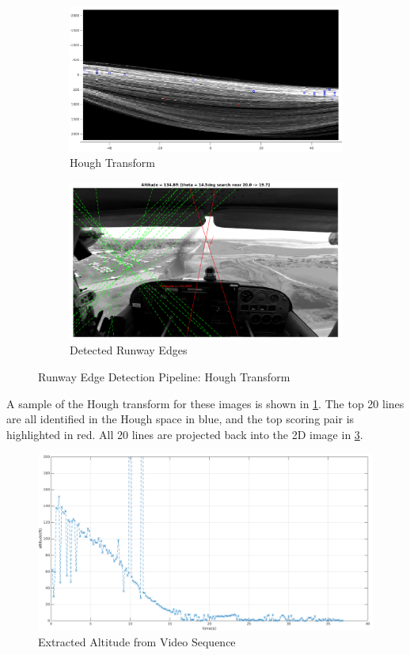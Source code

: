 \documentclass[letterpaper, conference]{IEEEtran}  %
\begin{document}
\begin{figure}
\centering
\begin{subfigure}{\textwidth}
	\includegraphics[width= \textwidth]{Hough.png} 
	\caption{\label{fig:Hough}  Hough Transform}
\end{subfigure}
\begin{subfigure}{\textwidth}
    \centering
	\includegraphics[width= \textwidth]{result.png} 
	\caption{\label{fig:final}  Detected Runway Edges}
\end{subfigure}
\caption{Runway Edge Detection Pipeline: Hough Transform}
\end{figure}

A sample of the Hough transform for these images is shown in \cref{fig:Hough}. The top 20 lines are all identified in the Hough space in blue, and the top scoring pair is highlighted in red. All 20 lines are projected back into the 2D image in \cref{fig:final}.
\newpage

\begin{figure}[ht]
\centering
	\includegraphics[width=  \textwidth]{alt.png} 
	\caption{\label{fig:alt}  Extracted Altitude from Video Sequence}
\end{figure}
\end{document}
